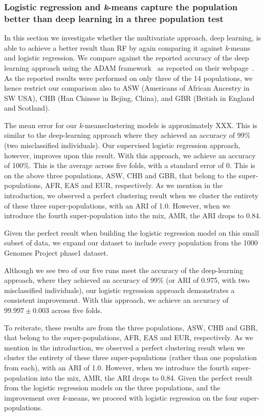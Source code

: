 \documentclass{llncs}
\newcommand{\kMeans}{\textit{k}-means}
\begin{document}
{%
\subsubsection{Logistic regression and \kMeans{} capture the population better than deep learning in a three population test}
In this section we investigate whether the multivariate approach, deep learning, is able to achieve a better result than RF by again comparing it against \kMeans{} and logistic regression.  
We compare against the reported accuracy of the deep learning approach using the {\sc ADAM} framework~\cite{Massie2013} as reported on their webpage~\cite{Ferguson}. 
As the reported results were performed on only three of the 14 populations, we hence restrict our comparison also to ASW (Americans of African Ancestry in SW USA), CHB (Han Chinese in Bejing, China), and GBR (British in England and Scotland).

The mean error for our \kMeans clustering models is approximately XXX. This is similar to the deep-learning approach where they achieved an accuracy of 99\% (two misclassified individuals). Our supervised logistic regression approach, however, improves upon this result.
With this approach, we achieve an accuracy of 100\%. This is the average across five folds, with a standard error of 0. This is on the above three populations, ASW, CHB and GBR, that belong to the super-populations, AFR, EAS and EUR, respectively.
As we mention in the introduction, we observed a perfect clustering result when we cluster the entirety of these three super-populations, with an ARI of 1.0. However, when we introduce the fourth super-population into the mix, AMR, the ARI drops to 0.84.


Given the perfect result when building the logistic regression model on this small subset of data, we expand our dataset to include every population from the 1000 Genomes Project phase1 dataset.  

Although we see two of our five runs meet the accuracy of the deep-learning approach, where they achieved an accuracy of 99\% (or ARI of 0.975, with two misclassified individuals), our logistic regression approach demonstrates a consistent improvement.
With this approach, we achieve an accuracy of \(99.997 \pm 0.003\) across five folds.

To reiterate, these results are from the three populations, ASW, CHB and GBR, that belong to the super-populations, AFR, EAS and EUR, respectively.
As we mention in the introduction, we observed a perfect clustering result when we cluster the entirety of these three super-populations (rather than one population from each), with an ARI of 1.0. However, when we introduce the fourth super-population into the mix, AMR, the ARI drops to 0.84.
Given the perfect result from the logistic regression models on the three populations, and the improvement over \kMeans{}, we proceed with logistic regression on the four super-populations.  

}
\end{document}
